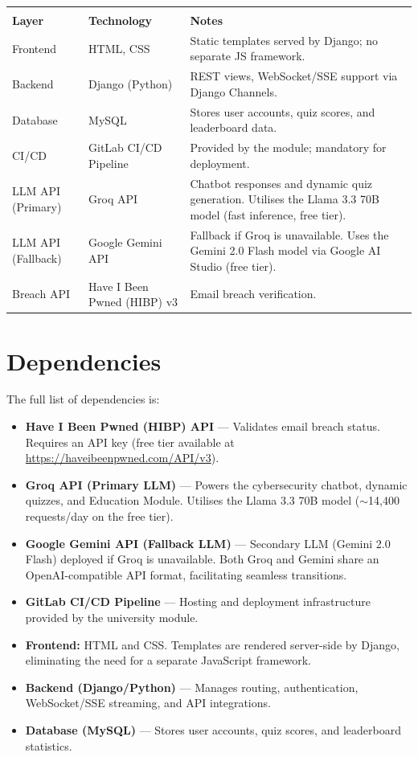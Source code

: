 \documentclass[11pt, a4paper]{report}
\begin{document}
\begin{table}[!htpb]
    \setlength{\extrarowheight}{2pt}
    \begin{tabularx}{\textwidth}{llX}
        \toprule
        \\[-1.5\normalbaselineskip]
        \textbf{Layer} & \textbf{Technology} & \textbf{Notes} \\ [0em]
        \midrule
        Frontend & HTML, CSS & Static templates served by Django; no separate JS framework. \\
        Backend & Django (Python) & REST views, WebSocket/SSE support via Django Channels. \\
        Database & MySQL & Stores user accounts, quiz scores, and leaderboard data. \\
        CI/CD & GitLab CI/CD Pipeline & Provided by the module; mandatory for deployment. \\
        LLM API (Primary) & Groq API & Chatbot responses and dynamic quiz generation. Utilises the Llama 3.3 70B model (fast inference, free tier). \\
        LLM API (Fallback) & Google Gemini API & Fallback if Groq is unavailable. Uses the Gemini 2.0 Flash model via Google AI Studio (free tier). \\
        Breach API & Have I Been Pwned (HIBP) v3 & Email breach verification. \\
        \bottomrule
    \end{tabularx}
\end{table}

\newpage

\section{Dependencies}
The full list of dependencies is:
\begin{itemize}
    \item \textbf{Have I Been Pwned (HIBP) API} --- Validates email breach status. Requires an API key (free tier available at \url{https://haveibeenpwned.com/API/v3}).
    \item \textbf{Groq API (Primary LLM)} --- Powers the cybersecurity chatbot, dynamic quizzes, and Education Module. Utilises the Llama 3.3 70B model ($\sim$14,400 requests/day on the free tier).
    \item \textbf{Google Gemini API (Fallback LLM)} --- Secondary LLM (Gemini 2.0 Flash) deployed if Groq is unavailable. Both Groq and Gemini share an OpenAI-compatible API format, facilitating seamless transitions.
    \item \textbf{GitLab CI/CD Pipeline} --- Hosting and deployment infrastructure provided by the university module.
    \item \textbf{Frontend:} HTML and CSS. Templates are rendered server-side by Django, eliminating the need for a separate JavaScript framework.
    \item \textbf{Backend (Django/Python)} --- Manages routing, authentication, WebSocket/SSE streaming, and API integrations.
    \item \textbf{Database (MySQL)} --- Stores user accounts, quiz scores, and leaderboard statistics.
\end{itemize}
\end{document}
